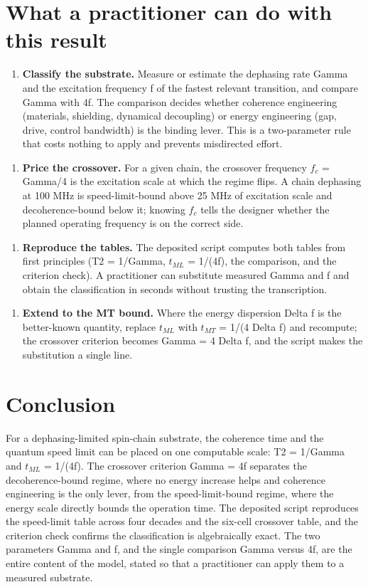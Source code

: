 \documentclass[11pt]{article}
\begin{document}
\section{What a practitioner can do with this result}
\begin{enumerate}
  \item \textbf{Classify the substrate.} Measure or estimate the dephasing rate Gamma and the excitation frequency f of the fastest relevant transition, and compare Gamma with 4f. The comparison decides whether coherence engineering (materials, shielding, dynamical decoupling) or energy engineering (gap, drive, control bandwidth) is the binding lever. This is a two-parameter rule that costs nothing to apply and prevents misdirected effort.
\end{enumerate}
\begin{enumerate}
  \item \textbf{Price the crossover.} For a given chain, the crossover frequency $f_{c}$ = Gamma/4 is the excitation scale at which the regime flips. A chain dephasing at 100 MHz is speed-limit-bound above 25 MHz of excitation scale and decoherence-bound below it; knowing $f_{c}$ tells the designer whether the planned operating frequency is on the correct side.
\end{enumerate}
\begin{enumerate}
  \item \textbf{Reproduce the tables.} The deposited script computes both tables from first principles (T2 = 1/Gamma, $t_{ML}$ = 1/(4f), the comparison, and the criterion check). A practitioner can substitute measured Gamma and f and obtain the classification in seconds without trusting the transcription.
\end{enumerate}
\begin{enumerate}
  \item \textbf{Extend to the MT bound.} Where the energy dispersion Delta f is the better-known quantity, replace $t_{ML}$ with $t_{MT}$ = 1/(4 Delta f) and recompute; the crossover criterion becomes Gamma = 4 Delta f, and the script makes the substitution a single line.
\end{enumerate}
\section{Conclusion}
For a dephasing-limited spin-chain substrate, the coherence time and the quantum speed limit can be placed on one computable scale: T2 = 1/Gamma and $t_{ML}$ = 1/(4f). The crossover criterion Gamma = 4f separates the decoherence-bound regime, where no energy increase helps and coherence engineering is the only lever, from the speed-limit-bound regime, where the energy scale directly bounds the operation time. The deposited script reproduces the speed-limit table across four decades and the six-cell crossover table, and the criterion check confirms the classification is algebraically exact. The two parameters Gamma and f, and the single comparison Gamma versus 4f, are the entire content of the model, stated so that a practitioner can apply them to a measured substrate.
\end{document}
